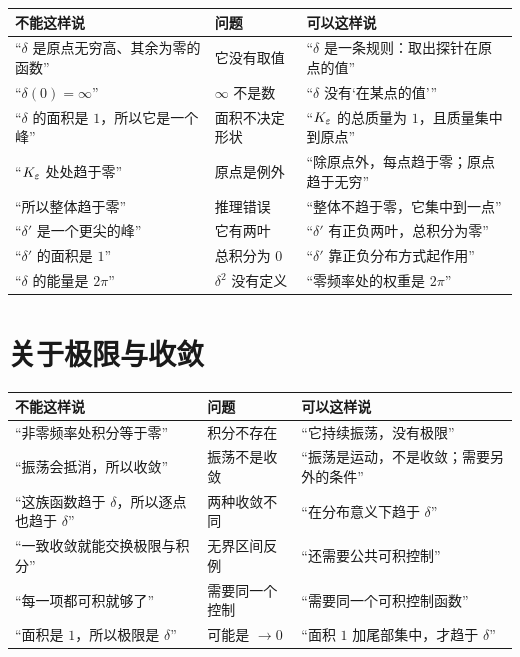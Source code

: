 \begin{center}
\small
\renewcommand{\arraystretch}{1.45}
\begin{tabularx}{\textwidth}{@{}L{4.9cm}L{4.2cm}Y@{}}
\toprule
不能这样说 & 问题 & 可以这样说 \\
\midrule
“$\delta$ 是原点无穷高、其余为零的函数” & 它没有取值 & “$\delta$ 是一条规则：取出探针在原点的值” \\
“$\delta(0)=\infty$” & $\infty$ 不是数 & “$\delta$ 没有‘在某点的值’” \\
“$\delta$ 的面积是 $1$，所以它是一个峰” & 面积不决定形状 & “$K_\varepsilon$ 的总质量为 $1$，且质量集中到原点” \\
“$K_\varepsilon$ 处处趋于零” & 原点是例外 & “除原点外，每点趋于零；原点趋于无穷” \\
“所以整体趋于零” & 推理错误 & “整体不趋于零，它集中到一点” \\
“$\delta'$ 是一个更尖的峰” & 它有两叶 & “$\delta'$ 有正负两叶，总积分为零” \\
“$\delta'$ 的面积是 $1$” & 总积分为 $0$ & “$\delta'$ 靠正负分布方式起作用” \\
“$\delta$ 的能量是 $2\pi$” & $\delta^2$ 没有定义 & “零频率处的权重是 $2\pi$” \\
\bottomrule
\end{tabularx}
\end{center}

\section{关于极限与收敛}

\begin{center}
\small
\renewcommand{\arraystretch}{1.45}
\begin{tabularx}{\textwidth}{@{}L{4.9cm}L{4.2cm}Y@{}}
\toprule
不能这样说 & 问题 & 可以这样说 \\
\midrule
“非零频率处积分等于零” & 积分不存在 & “它持续振荡，没有极限” \\
“振荡会抵消，所以收敛” & 振荡不是收敛 & “振荡是运动，不是收敛；需要另外的条件” \\
“这族函数趋于 $\delta$，所以逐点也趋于 $\delta$” & 两种收敛不同 & “在分布意义下趋于 $\delta$” \\
“一致收敛就能交换极限与积分” & 无界区间反例 & “还需要公共可积控制” \\
“每一项都可积就够了” & 需要同一个控制 & “需要同一个可积控制函数” \\
“面积是 $1$，所以极限是 $\delta$” & 可能是 $\to0$ & “面积 $1$ 加尾部集中，才趋于 $\delta$” \\
\bottomrule
\end{tabularx}
\end{center}

